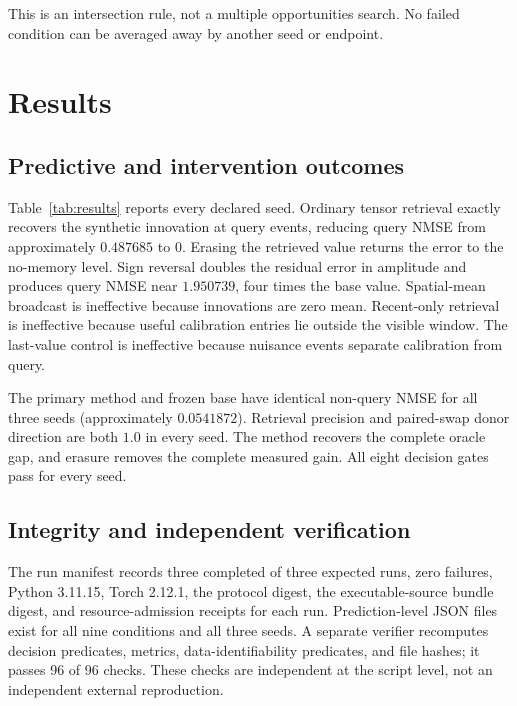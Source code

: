 \documentclass[11pt]{article}
\begin{document}
This is an intersection rule, not a multiple opportunities search. No failed
condition can be averaged away by another seed or endpoint.

\section{Results}



\subsection{Predictive and intervention outcomes}

Table~\ref{tab:results} reports every declared seed. Ordinary tensor retrieval
exactly recovers the synthetic innovation at query events, reducing query NMSE
from approximately $0.487685$ to $0$. Erasing the retrieved value returns the
error to the no-memory level. Sign reversal doubles the residual error in
amplitude and produces query NMSE near $1.950739$, four times the base value.
Spatial-mean broadcast is ineffective because innovations are zero mean.
Recent-only retrieval is ineffective because useful calibration entries lie
outside the visible window. The last-value control is ineffective because
nuisance events separate calibration from query.

The primary method and frozen base have identical non-query NMSE for all three
seeds (approximately $0.0541872$). Retrieval precision and paired-swap donor
direction are both $1.0$ in every seed. The method recovers the complete oracle
gap, and erasure removes the complete measured gain. All eight decision gates
pass for every seed.

\subsection{Integrity and independent verification}

The run manifest records three completed of three expected runs, zero failures,
Python 3.11.15, Torch 2.12.1, the protocol digest, the executable-source bundle
digest, and resource-admission receipts for each run. Prediction-level JSON
files exist for all nine conditions and all three seeds. A separate verifier
recomputes decision predicates, metrics, data-identifiability predicates, and
file hashes; it passes 96 of 96 checks. These checks are independent at the
script level, not an independent external reproduction.
\end{document}
